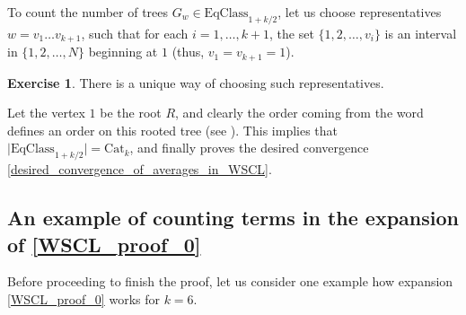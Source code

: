 \documentclass[letterpaper,11pt,oneside,reqno]{amsart}
\numberwithin{equation}{section}
\newcommand{\lect}[1]{}
\theoremstyle{definition}
\newtheorem{exercise}[proposition]{Exercise}
\begin{document}
To count the number of trees $G_w\in\text{EqClass}_{1+k/2}$, 
let us choose representatives $w=v_1 \ldots v_{k+1}$,
such that for each $i=1,\ldots,k+1$, the set $\{1,2,\ldots,v_i\}$
is an interval in $\{1,2,\ldots,N\}$ beginning at $1$
(thus, $v_1=v_{k+1}=1$).
\begin{exercise}
	There is a unique way of choosing such representatives.
\end{exercise}
Let the vertex $1$ be the root $R$, and clearly the order coming from the word
defines an order on this rooted tree (see ). This implies that 
$\big|\text{EqClass}_{1+k/2}\big|=\mathrm{Cat}_k$, and
finally proves the desired convergence \eqref{desired_convergence_of_averages_in_WSCL}.


\lect{1/27/2016}

\subsection{An example of counting terms in the expansion of \cref{WSCL_proof_0}} %
\label{sub:an_example_WSCL_proof}

Before proceeding to finish the proof, let us consider one example 
how expansion \eqref{WSCL_proof_0} works 
for $k=6$.
\end{document}
